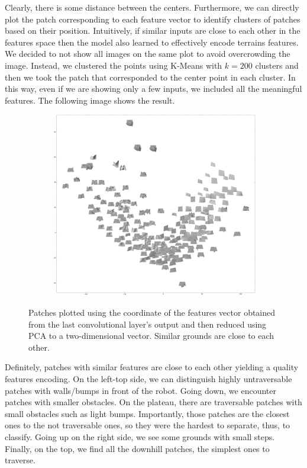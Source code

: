 \documentclass[../document.tex]{subfiles}
\begin{document}
Clearly, there is some distance between the centers. Furthermore, we can directly plot the patch corresponding to each feature vector to identify clusters of patches based on their position. Intuitively, if similar inputs are close to each other in the features space then the model also learned to effectively encode terrains features.   We decided to not show all images on the same plot to avoid overcrowding the image. Instead, we clustered the points using K-Means with $k=200$ clusters and then we took the patch that corresponded to the center point in each cluster. In this way, even if we are showing only a few inputs, we included all the meaningful features. The following image shows the result. 
\begin{figure} [htbp]
    \centering
    \begin{subfigure}[b]{1\textwidth}
        \includegraphics[width=\linewidth]{../img/5/pca/pca-patches-200.png}
    \end{subfigure}
    \caption{Patches plotted using the coordinate of the features vector obtained from the last convolutional layer's output and then reduced using PCA to a two-dimensional vector. Similar grounds are close to each other.}
    \label{fig : pca-patches-200}
\end{figure}
Definitely, patches with similar features are close to each other yielding a quality features encoding. On the left-top side, we can distinguish highly untraversable patches with walls/bumps in front of the robot. Going down, we encounter patches with smaller obstacles. On the plateau, there are traversable patches with small obstacles such as light bumps. Importantly,  those patches are the closest ones to the not traversable ones, so they were the hardest to separate, thus, to classify.  Going up on the right side, we see some grounds with small steps. Finally, on the top, we find all the downhill patches, the simplest ones to traverse.
\end{document}
